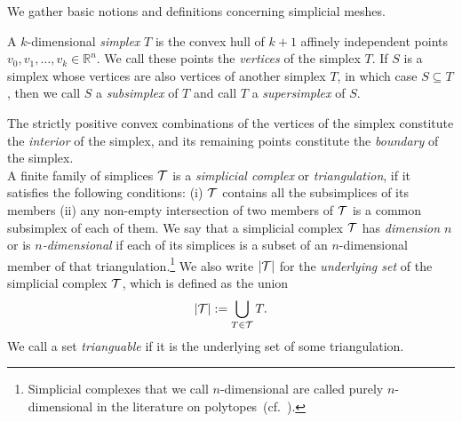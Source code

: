 \documentclass[10pt,letterpaper]{article}
\begin{document}
We gather basic notions and definitions concerning simplicial meshes. 
  
A ${k}$-dimensional \emph{simplex} $T$ is the convex hull of ${k}+1$ affinely independent points $v_0, v_1, \ldots, v_{{k}} \in \mathbb{R}^{n}$. We call these points the \emph{vertices} of the simplex $T$. 
If $S$ is a simplex whose vertices are also vertices of another simplex $T$, in which case $S \subseteq T$, 
then we call $S$ a \textit{subsimplex} of $T$ and call $T$ a \textit{supersimplex} of $S$. 

The strictly positive convex combinations of the vertices of the simplex constitute the \textit{ interior} of the simplex,
and its remaining points constitute the \textit{boundary} of the simplex.
\\

A finite family of simplices ${\mathcal T}$ is a \emph{simplicial complex} or \emph{triangulation}, if it satisfies the following conditions: 
(i) ${\mathcal T}$ contains all the subsimplices of its members (ii) any non-empty intersection of two members of ${\mathcal T}$ is a common subsimplex of each of them. 
We say that a simplicial complex ${\mathcal T}$ has \textit{dimension $n$} or is \textit{$n$-dimensional} if each of its simplices is a subset of an $n$-dimensional member of that triangulation.\footnote{Simplicial complexes that we call $n$-dimensional are called purely $n$-dimensional in the literature on polytopes~(cf.\ \cite{ziegler2012lectures}).} 
We also write $\left| {\mathcal T} \right|$ for the \textit{underlying set} of the simplicial complex ${\mathcal T}$, which is defined as the union 
\begin{align*}
    \left| {\mathcal T} \right| := \bigcup_{ T \in {\mathcal T} } T
    .
\end{align*}
We call a set \textit{trianguable} if it is the underlying set of some triangulation. 
\end{document}
